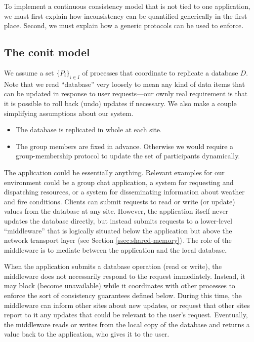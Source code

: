 \documentclass[]             %
{NASA}                       %
\theoremstyle{definition}
\providecommand{\tightlist}{%
  \setlength{\itemsep}{0pt}\setlength{\parskip}{0pt}}
\begin{document}
To implement a continuous consistency model that is not tied to one
application, we must first explain how inconsistency can be quantified
generically in the first place. Second, we must explain how a generic
protocols can be used to enforce.

\subsection{The conit model}
\label{ssec:conits}

We assume a set $\{P_i\}_{i \in I}$ of processes that coordinate to
replicate a database $D$. Note that we read ``database'' very loosely
to mean any kind of data items that can be updated in response to user
requests---our ownly real requirement is that it is possible to roll
back (undo) updates if necessary. We also make a couple simplifying
assumptions about our system.
\begin{itemize}
  \tightlist
\item The database is replicated in whole at each site.
\item The group members are fixed in advance. Otherwise we would
  require a group-membership protocol to update the set of
  participants dynamically.
\end{itemize}

The application could be essentially anything. Relevant examples for
our environment could be a group chat application, a system for
requesting and dispatching resources, or a system for disseminating
information about weather and fire conditions. Clients can submit
requests to read or write (or update) values from the database at any
site. However, the application itself never updates the database
directly, but instead submits requests to a lower-level ``middleware''
that is logically situated below the application but above the network
transport layer (see Section \ref{ssec:shared-memory}). The role of
the middleware is to mediate between the application and the local
database.

When the application submits a database operation (read or write), the
middleware does not necessarily respond to the request
immediately. Instead, it may block (become unavailable) while it
coordinates with other processes to enforce the sort of consistency
guarantees defined below. During this time, the middleware can inform
other sites about new updates, or request that other sites report to
it any updates that could be relevant to the user's
request. Eventually, the middleware reads or writes from the local
copy of the database and returns a value back to the application, who
gives it to the user.
\end{document}
